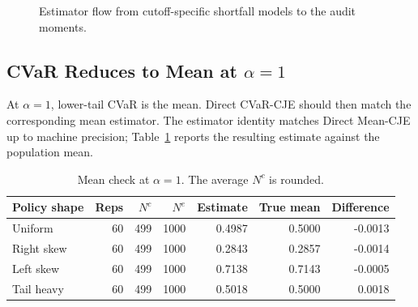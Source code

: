 \documentclass[11pt]{article}
\newcommand{\Dc}{D^{c}}
\newcommand{\De}{D^{e}}
\newcommand{\Da}{D^{a}}
\begin{document}
\begin{figure}[htbp]
\centering
{}
\caption{Estimator flow from cutoff-specific shortfall models to the audit moments.}
\label{fig-flow}
\end{figure}

\subsection{CVaR Reduces to Mean at \(\alpha=1\)}

At \(\alpha=1\), lower-tail CVaR is the mean.  Direct CVaR-CJE should then
match the corresponding mean estimator. The estimator identity matches Direct
Mean-CJE up to machine precision; Table~\ref{tab-mean} reports the resulting
estimate against the population mean.

\begin{table}[H]
\centering
\small
\begin{tabular}{@{}lrrrrrr@{}}
\toprule
Policy shape & Reps & \(N^c\) & \(N^e\) & Estimate & True mean & Difference \\
\midrule
Uniform & 60 & 499 & 1000 & 0.4987 & 0.5000 & -0.0013 \\
Right skew & 60 & 499 & 1000 & 0.2843 & 0.2857 & -0.0014 \\
Left skew & 60 & 499 & 1000 & 0.7138 & 0.7143 & -0.0005 \\
Tail heavy & 60 & 499 & 1000 & 0.5018 & 0.5000 & 0.0018 \\
\bottomrule
\end{tabular}
\caption{Mean check at \(\alpha=1\).  The average \(N^c\) is rounded.}
\label{tab-mean}
\end{table}
\end{document}
